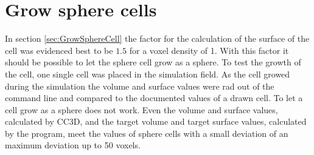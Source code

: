 \section{Grow sphere cells}
In section \ref{sec:GrowSphereCell} the factor for the calculation of the surface of the cell was evidenced best to be $1.5$ for a voxel density of 1. With this factor it should be possible to let the sphere cell grow as a sphere. To test the growth of the cell, one single cell was placed in the simulation field. As the cell growed during the simulation the volume and surface values were rad out of the command line and compared to the documented values of a drawn cell. \newline
To let a cell grow as a sphere does not work. Even the volume and surface values, calculated by \ac{CC3D}, and the target volume and target surface values, calculated by the program, meet the values of sphere cells with a small deviation of an maximum deviation up to 50 voxels.


